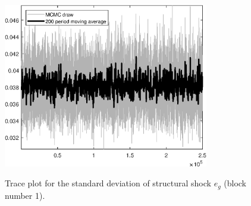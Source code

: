 \begin{figure}[H]
\centering
  \includegraphics[width=0.8\textwidth]{BRS_growth_ext_comovement/graphs/TracePlot_SE_e_g_blck_1}\\
    \caption{Trace plot for the standard deviation of structural shock ${e_g}$ (block number 1).}
\end{figure}
